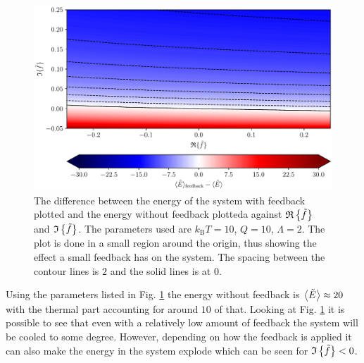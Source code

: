 \begin{figure}[t]
    \centering
    \includegraphics[width=\textwidth]{figures/energyFeedbackDifference.pdf}
    \caption{\small The difference between the energy of the system with feedback plotted and the energy without feedback plotteda against $\mathfrak{R}\left\{\tilde{f}\right\}$ and $\mathfrak{I}\left\{\tilde{f}\right\}$. The parameters used are $k_\text{B}T = 10$, $Q = 10$, $\Lambda = 2$. The plot is done in a small region around the origin, thus showing the effect a small feedback has on the system. The spacing between the contour lines is $2$ and the solid lines is at $0$.}
    \label{fig:energyFeedbackDifference}
\end{figure}

Using the parameters listed in Fig. \ref{fig:energyFeedbackDifference} the energy without feedback is $\expval{\tilde{E}} \approx 20$ with the thermal part accounting for around $10$ of that. Looking at Fig. \ref{fig:energyFeedbackDifference} it is possible to see that even with a relatively low amount of feedback the system will be cooled to some degree. However, depending on how the feedback is applied it can also make the energy in the system explode which can be seen for $\mathfrak{I}\left\{\tilde{f}\right\} < 0$.

